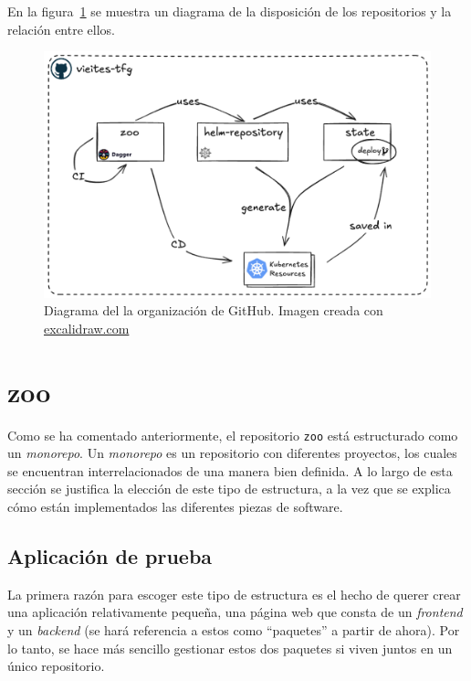 En la figura~\ref{fig:ghorg} se muestra un diagrama de la disposición de los repositorios y la relación entre ellos.

\begin{figure}
  \centerline{\includegraphics[width=14cm]{figuras/vieites-tfg}}
  \caption{Diagrama del la organización de GitHub. Imagen creada con \href{https://excalidraw.com}{excalidraw.com}}
  \label{fig:ghorg}
\end{figure}

\section*{zoo}

Como se ha comentado anteriormente, el repositorio \texttt{zoo} está estructurado como un \textit{monorepo}. Un \textit{monorepo} es un repositorio con diferentes proyectos, los cuales se encuentran interrelacionados de una manera bien definida. A lo largo de esta sección se justifica la elección de este tipo de estructura, a la vez que se explica cómo están implementados las diferentes piezas de software.

\subsection*{Aplicación de prueba}

La primera razón para escoger este tipo de estructura es el hecho de querer crear una aplicación relativamente pequeña, una página web que consta de un \textit{frontend} y un \textit{backend} (se hará referencia a estos como ``paquetes'' a partir de ahora). Por lo tanto, se hace más sencillo gestionar estos dos paquetes si viven juntos en un único repositorio.

